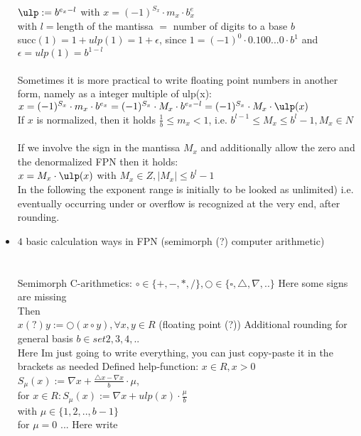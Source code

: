 \begin{itemize}
$\ulp:=b^{e_x-l}$ with $x=(-1)^{S_x}\cdot m_x \cdot b^e_x$ \\
with $l=$length of the mantissa $=$ number of digits to a base $b$ \\
succ$(1)=1+ulp(1)=1+\epsilon$, since $1=(-1)^0\cdot 0.100...0\cdot b^1$ and $\epsilon =ulp(1)=b^{1-l}$ \\
\\
Sometimes it is more practical to write floating point numbers in another form, namely as a integer multiple of ulp(x): \\
$x=(-1)^{S_x}\cdot m_x\cdot b^{e_x}=(-1)^{S_x}\cdot M_x\cdot b^{e_x-l}=(-1)^{S_x}\cdot M_x\cdot \ulp(x)$ \\

If $x$ is normalized, then it holds $\frac{1}{b}\le m_x<1$, i.e. $b^{l-1}\le M_x\le b^l-1, M_x\in N$ \\
\\
If we involve the sign in the mantissa $M_x$ and additionally allow the zero and the denormalized FPN then it holds: \\
$x=M_x\cdot \ulp(x)$ with $M_x\in Z, |M_x|\le b^l-1$ \\
In the following the exponent range is initially to be looked as unlimited) i.e. eventually occurring under or overflow is recognized at the very end, after rounding.
\item $4$ basic calculation ways in FPN (semimorph (?) computer arithmetic) \\
\\
\\
Semimorph C-arithmetics: $\circ\in \{+,-,*,/\}, \bigcirc\in \{\square,\triangle, \nabla, ..\}$ Here some signs are missing \\
Then \\
$x(?)y:=\bigcirc(x\circ y), \forall x,y\in R$ (floating point (?))
Additional rounding for general basis $b\in set{2,3,4,..}$ \\
Here Im just going to write everything, you can just copy-paste it in the brackets as needed
Defined help-function: $x\in R, x>0 $ \\
$S_\mu(x):=\nabla x+\frac{\triangle x-\nabla x}{b}\cdot \mu $, \\
for $x\in R: S_\mu(x):= \nabla x+ulp(x)\cdot \frac{\mu}{b}$ 
\\
with $\mu\in \{1,2,..,b-1\}$ \\
for $\mu=0$ ... Here write \\

\end{itemize}
